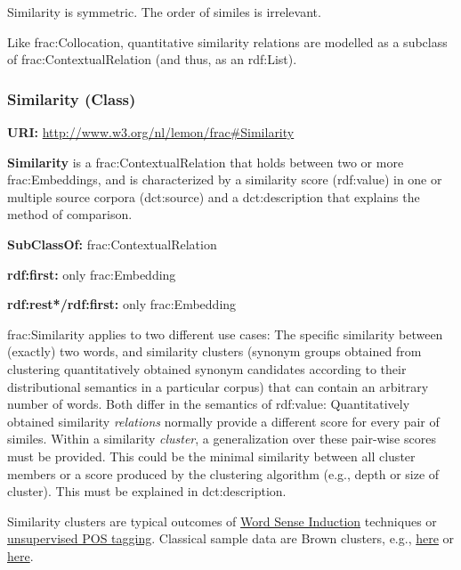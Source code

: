 \documentclass[a4paper]{article}
\newcommand\textstyleInternetlink[1]{\textcolor[rgb]{0.0,0.0,0.5019608}{#1}}
\newcommand\textstyleStrongEmphasis[1]{\textbf{#1}}
\newcommand\textstyleTeletype[1]{\textrm{#1}}
\begin{document}
Similarity is symmetric. The order of similes is irrelevant.

Like \textstyleTeletype{frac:Collocation}, quantitative similarity relations are modelled as a subclass of \textstyleTeletype{frac:ContextualRelation} (and thus, as an \textstyleTeletype{rdf:List}).

\subsubsection[Similarity (Class)]{Similarity (Class)}
\textstyleStrongEmphasis{URI:} \url{http://www.w3.org/nl/lemon/frac#Similarity}

\textstyleStrongEmphasis{Similarity} is a \textstyleTeletype{frac:ContextualRelation} that holds between two or more \textstyleTeletype{frac:Embedding}s, and is characterized by a similarity score (\textstyleTeletype{rdf:value}) in one or multiple source corpora (\textstyleTeletype{dct:source}) and a \textstyleTeletype{dct:description} that explains the method of comparison. 

\textstyleStrongEmphasis{SubClassOf:} \textstyleTeletype{frac:ContextualRelation}

\textstyleStrongEmphasis{rdf:first:} only \textstyleTeletype{frac:Embedding}

\textstyleStrongEmphasis{rdf:rest*/rdf:first:} only \textstyleTeletype{frac:Embedding} 

\textstyleTeletype{frac:Similarity} applies to two different use cases: The specific similarity between (exactly) two words, and similarity clusters (synonym groups obtained from clustering quantitatively obtained synonym candidates according to their distributional semantics in a particular corpus) that can contain an arbitrary number of words. Both differ in the semantics of \textstyleTeletype{rdf:value}: Quantitatively obtained similarity \textit{relations} normally provide a different score for every pair of similes. Within a similarity \textit{cluster}, a generalization over these pair-wise scores must be provided. This could be the minimal similarity between all cluster members or a score produced by the clustering algorithm (e.g., depth or size of cluster). This must be explained in \textstyleTeletype{dct:description}. 

Similarity clusters are typical outcomes of \href{https://www.cs.york.ac.uk/semeval2010_WSI/datasets.html}{\textstyleInternetlink{Word Sense Induction}} techniques or \href{http://www.aclweb.org/anthology/D10-1056}{\textstyleInternetlink{unsupervised POS tagging}}. Classical sample data are Brown clusters, e.g., \href{https://github.com/Derekkk/Brown-Word-Clustering-and-word-similarity/blob/master/results-brown.txt}{\textstyleInternetlink{here}} or \href{https://s3-eu-west-1.amazonaws.com/downloads.gate.ac.uk/resources/derczynski-chester-boegh-brownpaths.tar.bz2}{\textstyleInternetlink{here}}. 
\end{document}
